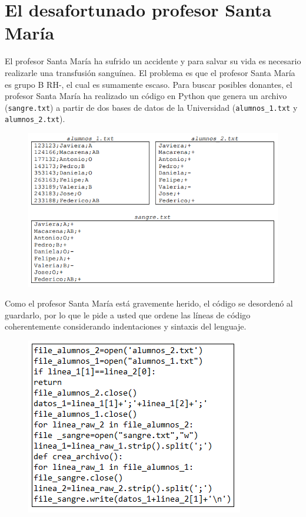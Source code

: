 \section{El desafortunado profesor Santa María}

El profesor Santa María ha sufrido un accidente y para salvar su vida es necesario realizarle una transfusión sanguínea. El problema es que el profesor Santa María es grupo B RH-, el cual es sumamente escaso. Para buscar posibles donantes, el profesor Santa María ha realizado un código en Python que genera un archivo (\texttt{sangre.txt}) a partir de dos bases de datos de la Universidad (\texttt{alumnos\_1.txt} y \texttt{alumnos\_2.txt}).
\begin{figure}[h]
    \centering
    \includegraphics{Imagenes/sangre.png}
\end{figure}

Como el profesor Santa María está gravemente herido, el código se desordenó al guardarlo, por lo que le pide a usted que ordene las líneas de código coherentemente considerando indentaciones y sintaxis del lenguaje.

\begin{figure}[h]
    \centering
    \includegraphics[scale=0.9]{Imagenes/desorden.png}
\end{figure}

